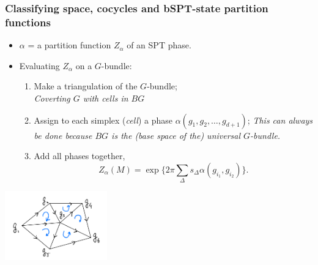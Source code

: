 \documentclass[xcolor=table, aspectratio=169,ignorenonframetext]{beamer}
\begin{document}
\begin{frame}
	\frametitle{Classifying space, cocycles and bSPT-state partition functions}
	\begin{itemize}
		\item
		$\alpha$ = a partition function $Z_\alpha$ of an SPT phase.
		\item Evaluating $Z_\alpha$ on a $G$-bundle:
		\begin{enumerate}
			\item Make a triangulation of the $G$-bundle;\\
			\emph{Coverting $G$ with cells in $BG$}
			\item Assign to each simplex (\emph{cell}) a phase
			$\alpha(g_1,g_2,\ldots,g_{d+1})$;
			 \emph{This can always be done because $BG$ is the (base space of the) universal $G$-bundle.}
			\item Add all phases together,
			\[Z_\alpha(M) = \exp\{2\pi \sum_{\Delta}s_\Delta\alpha(g_{i_1},g_{i_2})\}.\]
		\end{enumerate}
	\end{itemize}
	\begin{center}
		\includegraphics[height=3cm]{../spt-lecture/tri-orient}
	\end{center}
\end{frame}
\end{document}
